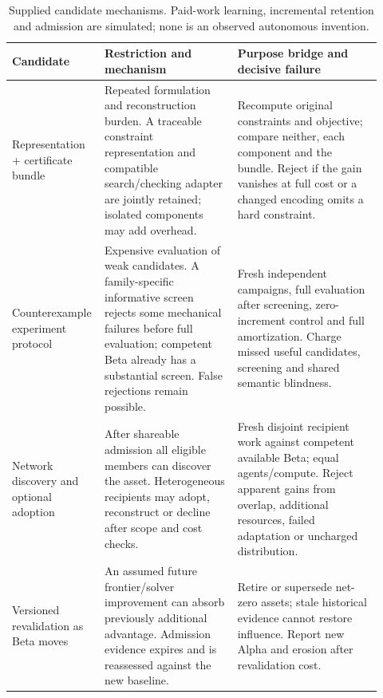 \begin{table}[!htbp]\centering\small
\caption{Supplied candidate mechanisms. Paid-work learning, incremental retention and admission are simulated; none is an observed autonomous invention.}
\begin{tabularx}{\linewidth}{>{\raggedright\arraybackslash}p{0.19\linewidth}>{\raggedright\arraybackslash}p{0.35\linewidth}>{\raggedright\arraybackslash}p{0.38\linewidth}}\toprule
Candidate & Restriction and mechanism & Purpose bridge and decisive failure\\\midrule
Representation + certificate bundle & Repeated formulation and reconstruction burden. A traceable constraint representation and compatible search/checking adapter are jointly retained; isolated components may add overhead. & Recompute original constraints and objective; compare neither, each component and the bundle. Reject if the gain vanishes at full cost or a changed encoding omits a hard constraint.\\
Counterexample experiment protocol & Expensive evaluation of weak candidates. A family-specific informative screen rejects some mechanical failures before full evaluation; competent Beta already has a substantial screen. False rejections remain possible. & Fresh independent campaigns, full evaluation after screening, zero-increment control and full amortization. Charge missed useful candidates, screening and shared semantic blindness.\\
Network discovery and optional adoption & After shareable admission all eligible members can discover the asset. Heterogeneous recipients may adopt, reconstruct or decline after scope and cost checks. & Fresh disjoint recipient work against competent available Beta; equal agents/compute. Reject apparent gains from overlap, additional resources, failed adaptation or uncharged distribution.\\
Versioned revalidation as Beta moves & An assumed future frontier/solver improvement can absorb previously additional advantage. Admission evidence expires and is reassessed against the new baseline. & Retire or supersede net-zero assets; stale historical evidence cannot restore influence. Report new Alpha and erosion after revalidation cost.\\
\bottomrule
\end{tabularx}
\par{}\par
\end{table}

